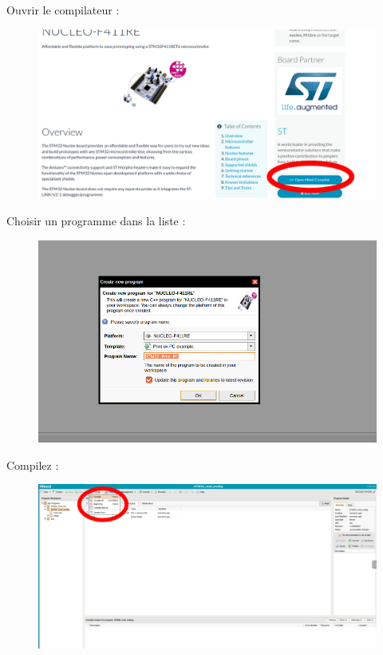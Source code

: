 \documentclass{article}
\begin{document}
Ouvrir le compilateur :

\begin{figure}[H]
\begin{center}
\advance\leftskip-3cm
\advance\rightskip-3cm
\includegraphics[keepaspectratio=true,scale=0.3]{open_mbedcompiler.png}
\label{visina8}
\end{center}\end{figure}

Choisir un programme dans la liste :

\begin{figure}[H]
\begin{center}
\advance\leftskip-3cm
\advance\rightskip-3cm
\includegraphics[keepaspectratio=true,scale=0.3]{choose_programm.png}
\label{visina8}
\end{center}\end{figure}

Compilez :
\begin{figure}[H]
\begin{center}
\advance\leftskip-3cm
\advance\rightskip-3cm
\includegraphics[keepaspectratio=true,scale=0.3]{compilE.png}
\label{visina8}
\end{center}\end{figure}
\end{document}
